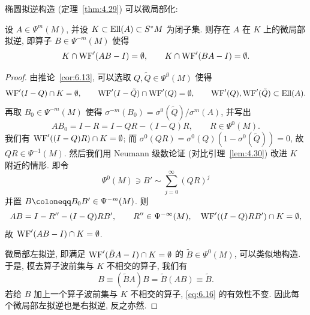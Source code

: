 椭圆拟逆构造 (定理~\ref{thm:4.29}) 可以微局部化:

\begin{proposition}[微局部椭圆拟逆]\label{prop:6.17}
设 $A \in \Psi^m(M)$, 并设 $K \subset \operatorname{Ell}(A) \subset S^* M$ 为闭子集. 则存在 $A$ 在 $K$ 上的微局部拟逆, 即算子 $B \in \Psi^{-m}(M)$ 使得
\begin{equation}\label{eq:6.16}
    K \cap \operatorname{WF}'(A B - I) = \emptyset, \qquad K \cap \operatorname{WF}'(B A - I) = \emptyset.
\end{equation}
\end{proposition}

\begin{proof}
由推论~\ref{cor:6.13}, 可以选取 $Q, \tilde{Q} \in \Psi^0(M)$ 使得
\begin{equation}\label{eq:6.17}
    \operatorname{WF}'(I - Q) \cap K = \emptyset, \qquad \operatorname{WF}'(I - \tilde{Q}) \cap \operatorname{WF}'(Q) = \emptyset, \qquad \operatorname{WF}'(Q), \operatorname{WF}'(\tilde{Q}) \subset \operatorname{Ell}(A).
\end{equation}
再取 $B_0 \in \Psi^{-m}(M)$ 使得 $\sigma^{-m}(B_0) = \sigma^0(\tilde{Q})/\sigma^m(A)$, 并写出
\begin{equation}\label{eq:6.18}
    A B_0 = I - R = I - Q R - (I - Q) R, \qquad R \in \Psi^0(M).
\end{equation}
我们有 $\operatorname{WF}'((I - Q)R) \cap K = \emptyset$; 而 $\sigma^0(Q R) = \sigma^0(Q)(1 - \sigma^0(\tilde{Q})) = 0$, 故 $Q R \in \Psi^{-1}(M)$. 然后我们用 Neumann 级数论证 (对比引理~\ref{lem:4.30}) 改进 $K$ 附近的情形. 即令
\begin{equation}\label{eq:6.19}
    \Psi^0(M) \ni B' \sim \sum_{j=0}^\infty (Q R)^j
\end{equation}
并置 $B \defeq B_0 B' \in \Psi^{-m}(M)$. 则
\begin{equation}\label{eq:6.20}
    A B = I - R'' - (I - Q) R B', \qquad R'' \in \Psi^{-\infty}(M), \quad \operatorname{WF}'((I - Q) R B') \cap K = \emptyset,
\end{equation}
故 $\operatorname{WF}'(A B - I) \cap K = \emptyset$.

微局部左拟逆, 即满足 $\operatorname{WF}'(\tilde{B} A - I) \cap K = \emptyset$ 的 $\tilde{B} \in \Psi^0(M)$, 可以类似地构造. 于是, 模去算子波前集与 $K$ 不相交的算子, 我们有
\begin{equation}\label{eq:6.21}
    B \equiv (\tilde{B} A) B = \tilde{B}(A B) \equiv \tilde{B}.
\end{equation}
若给 $B$ 加上一个算子波前集与 $K$ 不相交的算子, \eqref{eq:6.16} 的有效性不变. 因此每个微局部左拟逆也是右拟逆, 反之亦然.
\end{proof}

